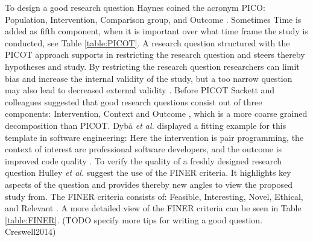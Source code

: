 To design a good research question Haynes coined the acronym PICO: Population, Intervention, Comparison group, and Outcome \cite{BrianHaynes2006}. Sometimes Time is added as fifth component, when it is important over what time frame the study is conducted, see Table \ref{table:PICOT}. A research question structured with the PICOT approach supports in restricting the research question and steers thereby hypotheses and study. By restricting the research question researchers can limit bias and increase the internal validity of the study, but a too narrow question may also lead to decreased external validity \cite{Farrugia2009}. Before PICOT Sackett and colleagues suggested that good research questions consist out of three components: Intervention, Context and Outcome \cite{Sackett2000}, which is a more coarse grained decomposition than PICOT. Dyb{\aa} \emph{et al.} displayed a fitting example for this template in software engineering:  \cite[p. 60]{Dyba2005} Here the intervention is pair programming, the context of interest are professional software developers, and the outcome is improved code quality \cite{Dyba2005}. To verify the quality of a freshly designed research question Hulley \emph{et al.} suggest the use of the FINER criteria. It highlights key aspects of the question and provides thereby new angles to view the proposed study from. The FINER criteria consists of: Feasible, Interesting, Novel, Ethical, and Relevant \cite{Farrugia2009}. A more detailed view of the FINER criteria can be seen in Table \ref{table:FINER}. {\color{red}(TODO specify more tips for writing a good question. Creswell2014)}  

